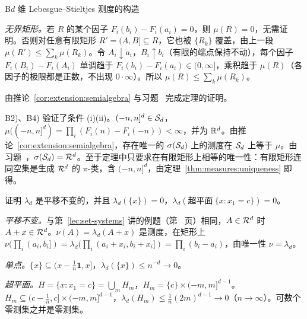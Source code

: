 \begin{probleme}{B}{$d$ 维 Lebesgue--Stieltjes 测度的构造}
\begin{questions}
\begin{solution}
\emph{无界矩形。}若 $R$ 的某个因子 $F_i(b_i)-F_i(a_i)=0$，则 $\mu(R)=0$，无需证明。否则对任意有限矩形 $R'=(A,B]\subseteq R$，它也被 $\{R_k\}$ 覆盖，由上一段 $\mu(R')\leqslant\sum_k\mu(R_k)$。令 $A_i\downarrow a_i$，$B_i\uparrow b_i$（有限的端点保持不动），每个因子 $F_i(B_i)-F_i(A_i)$ 单调趋于 $F_i(b_i)-F_i(a_i)\in(0,\infty]$，乘积趋于 $\mu(R)$（各因子的极限都是正数，不出现 $0\cdot\infty$）。所以 $\mu(R)\leqslant\sum_k\mu(R_k)$。
\end{solution}
\item 由推论~\ref{cor:extension:semialgebra} 与习题~ 完成定理的证明。
\begin{solution}
B2)、B4) 验证了条件 (i)(ii)。$(-n,n]^d\in\mathcal{S}_d$，$\mu((-n,n]^d)=\prod_i(F_i(n)-F_i(-n))<\infty$，并为 $\mathbb{R}^d$。由推论~\ref{cor:extension:semialgebra}，存在唯一的 $\sigma(\mathcal{S}_d)$ 上的测度在 $\mathcal{S}_d$ 上等于 $\mu$。由习题~，$\sigma(\mathcal{S}_d)=\mathcal{R}^d$。至于定理中只要求在有限矩形上相等的唯一性：有限矩形连同空集是生成 $\mathcal{R}^d$ 的 $\pi$-类，含 $(-n,n]^d$，由定理~\ref{thm:measures:uniqueness} 即得。
\end{solution}
\item 证明 $\lambda_d$ 是平移不变的，并且 $\lambda_d(\{x\})=0$，$\lambda_d(\text{超平面}\ \{x: x_1=c\})=0$。
\begin{solution}
\emph{平移不变。}与第~\ref{lec:set-systems} 讲的例题（第~\pageref{we:set-systems:translation} 页）相同，$A\in\mathcal{R}^d$ 时 $A+x\in\mathcal{R}^d$。$\nu(A)=\lambda_d(A+x)$ 是测度，在矩形上 $\nu(\prod_i(a_i,b_i])=\lambda_d(\prod_i(a_i+x_i,b_i+x_i])=\prod_i(b_i-a_i)$，由唯一性 $\nu=\lambda_d$。

\emph{单点。}$\{x\}\subseteq(x-\frac1n\mathbf 1,x]$，$\lambda_d(\{x\})\leqslant n^{-d}\to0$。

\emph{超平面。}$H=\{x:x_1=c\}=\bigcup_m H_m$，$H_m=\{c\}\times(-m,m]^{d-1}$。$H_m\subseteq(c-\frac1n,c]\times(-m,m]^{d-1}$，$\lambda_d(H_m)\leqslant\frac1n(2m)^{d-1}\to0$（$n\to\infty$）。可数个零测集之并是零测集。
\end{solution}
\end{questions}
\end{probleme}

